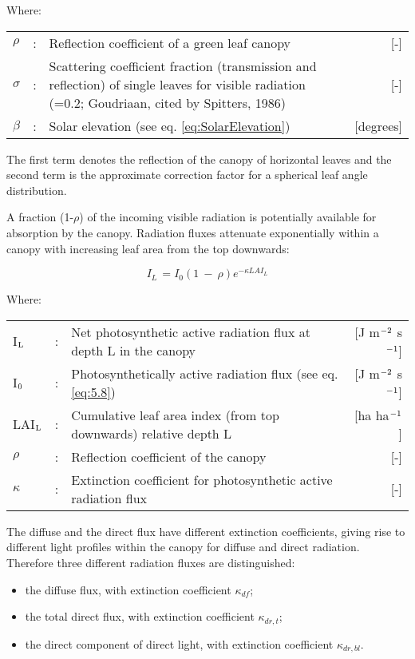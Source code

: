 Where:\\[5pt]
\begin{tabularx}{\textwidth}{llXr}
	$\rho$ &:& Reflection coefficient of a green leaf canopy    &    [-]\\
	$\sigma$ &:& Scattering coefficient fraction (transmission and reflection) 
	of single leaves for visible radiation   
	{\small (=0.2; Goudriaan, cited by Spitters, 1986)}  &     [-]\\  
	$\beta$ &:& Solar elevation (see eq. \ref{eq:SolarElevation})    &    [degrees]\\
\end{tabularx}

The first term denotes the reflection of the canopy of horizontal leaves and the second
term is the approximate correction factor for a spherical leaf angle distribution.

A fraction (1-$\rho$) of the incoming visible radiation is potentially available for absorption by
the canopy. Radiation fluxes attenuate exponentially within a canopy with increasing leaf
area from the top downwards:

\begin{equation}
\label{eq:5.13}
I_{L~} = I_{0} (1~-~\rho ) e^{-\kappa LAI_{L} }
\end{equation}

Where:\\[5pt]
\begin{tabularx}{\textwidth}{llXr}
	I$_{{\rm L}}$   &:& Net photosynthetic active radiation flux at 
	depth L in the canopy    &    [J m$^{{\rm -2}}$ s$^{{\rm -1}}$]\\
	I$_{{\rm 0}}$   &:& Photosynthetically active radiation flux (see eq. \ref{eq:5.8})  & 
	[J m$^{{\rm -2}}$ s$^{{\rm -1}}$]\\
	LAI$_{{\rm L}}$ &:& Cumulative leaf area index (from top downwards) 
	relative depth L & [ha ha$^{{\rm -1}}$]\\
	$\rho$          &:& Reflection coefficient of the canopy   &     [-]\\
	$\kappa$        &:& Extinction coefficient for photosynthetic active 
	radiation flux   &     [-]\\
\end{tabularx}

The diffuse and the direct flux have different extinction coefficients, giving rise to
different light profiles within the canopy for diffuse and direct radiation. Therefore three
different radiation fluxes are distinguished:
\begin{itemize}
	\item the diffuse flux, with extinction coefficient $\kappa_{df}$;
	\item the total direct flux, with extinction coefficient $\kappa_{dr,t}$;
	\item the direct component of direct light, with extinction coefficient $\kappa_{dr,bl}$.
\end{itemize}

